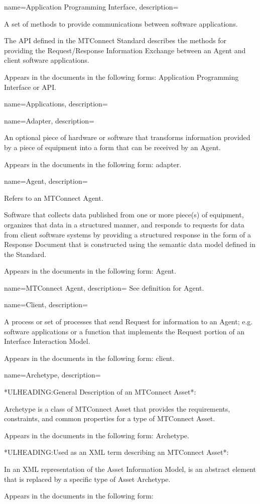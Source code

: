 
{
    name={Application Programming Interface},
	description={
  A set of methods to provide communications between software applications.

  The API defined in the MTConnect Standard describes the methods for providing the \gls{Request/Response} Information Exchange between an \gls{Agent} and client software applications.
  
  Appears in the documents in the following forms: Application Programming Interface or API.
}
}

{
    name={Applications},
	description={}
}

{
    name={Adapter},
	description={
  An optional piece of hardware or software that transforms information provided by a piece of equipment into a form that can be received by an \gls{Agent}.

  Appears in the documents in the following form: adapter.
}
}

{
    name={Agent},
	description={
  Refers to an MTConnect Agent. 
  
  Software that collects data published from one or more piece(s) of equipment, organizes that data in a structured manner, and responds to requests for data from client software systems by providing a structured response in the form of a \gls{Response Document} that is constructed using the \gls{semantic data model} defined in the Standard. 
  
  Appears in the documents in the following form: \gls{Agent}.
}
}

{
    name={MTConnect Agent},
	description={
	See definition for \gls{Agent}.
}
}

{
    name={Client},
	description={
  A process or set of processes that send \gls{Request} for information to an \gls{Agent}; e.g. software applications or a function that implements the \gls{Request} portion of an \gls{Interface} \gls{Interaction Model}.

  Appears in the documents in the following form: client.
}
}

{
    name={Archetype},
	description={
  *ULHEADING:General Description of an \gls{MTConnect Asset}*:
  
  Archetype is a class of \gls{MTConnect Asset} that provides the requirements, constraints, and common properties for a type of \gls{MTConnect Asset}.

  Appears in the documents in the following form: Archetype.

  *ULHEADING:Used as an XML term describing an \gls{MTConnect Asset}*:
  
  In an XML representation of the \gls{Asset Information Model},  is an abstract element that is replaced by a specific type of \gls{Asset} Archetype.
  
  Appears in the documents in the following form: 
}
}

